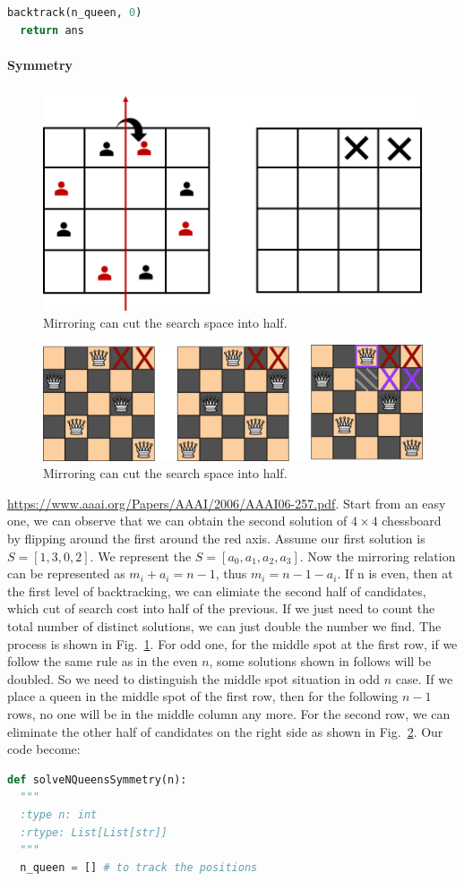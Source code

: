 \documentclass[../main.tex]{subfiles}
\begin{document}
\begin{enumerate}
\begin{lstlisting}[language=Python]
  backtrack(n_queen, 0)
  return ans
\end{lstlisting}
\paragraph{Symmetry}
\begin{figure}[!ht]
    \centering
    \includegraphics[width=0.6\columnwidth]{fig/n_queen_symmetry.png}
    \caption{Mirroring can cut the search space into half.}
    \label{fig:n_queen_symmetry}
\end{figure}
\begin{figure}[!ht]
    \centering
    \includegraphics[width=0.6\columnwidth]{fig/n_queen_oddPicture1.png}
    \caption{Mirroring can cut the search space into half.}
    \label{fig:n_queen_odd}
\end{figure}
\url{https://www.aaai.org/Papers/AAAI/2006/AAAI06-257.pdf}.  Start from  an easy one, we can observe that we can obtain the second solution of $4\times 4$ chessboard by flipping around the first around  the red axis. Assume our first solution is $S=[1, 3, 0, 2]$. We represent the $S=[a_0, a_1, a_2, a_3]$. Now the mirroring relation can be represented as $m_i+a_i=n-1$, thus $m_i=n-1-a_i$. If n is even, then at the first level of backtracking, we can elimiate the second half of candidates, which cut of search cost into half of the previous. If we just need to count the total number of distinct solutions, we can just double the number we find. The process is shown in Fig.~\ref{fig:n_queen_symmetry}. For odd one, for the middle spot at the first row, if we follow the same rule as in the even $n$, some solutions shown in follows will be doubled. So we need to distinguish the middle spot situation in odd $n$ case. If we place a queen in the middle spot of the first row, then for the following $n-1$ rows, no one will be in the middle column any more. For the second row, we can eliminate the other half of candidates on the right side as shown in Fig.~\ref{fig:n_queen_odd}. Our code become:
\begin{lstlisting}[language=Python]
def solveNQueensSymmetry(n):
  """
  :type n: int
  :rtype: List[List[str]]
  """
  n_queen = [] # to track the positions
      

\end{lstlisting}
\end{enumerate}
\end{document}
